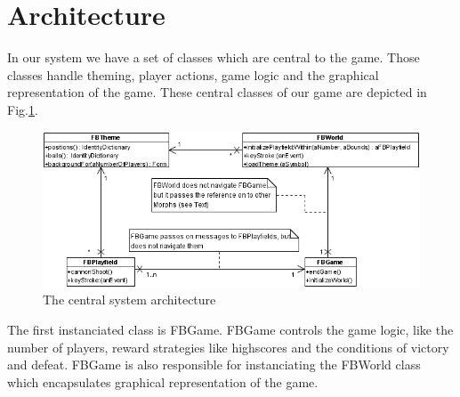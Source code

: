 \section{Architecture}
In our system we have a set of classes which are central to the 
game. Those classes handle theming, player actions, game logic 
and the graphical representation of the game. These central
classes of our game are depicted in Fig.\ref{fig:architecture}.
%
\begin{figure}[tbh]
  \begin{center}
    \includegraphics{images/architecture.png}
  \end{center}
  \caption{The central system architecture}
  \label{fig:architecture}
\end{figure}
%
The first instanciated class is FBGame. FBGame controls the game logic, 
like the number of players, reward strategies like highscores and the
conditions of victory and defeat. FBGame is also responsible for instanciating
the FBWorld class which encapsulates graphical representation of the game.


